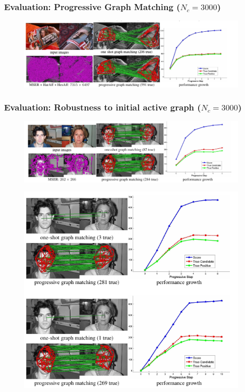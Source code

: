 \documentclass[hyperref={pdfpagelabels=false}]{beamer}
\begin{document}
\begin{frame}
\frametitle{Evaluation: Progressive Graph Matching ($N_c=3000$)}
\begin{figure}
  \includegraphics[scale=0.5]{fig6csub.png}
\end{figure}
\end{frame}


\begin{frame}[allowframebreaks]
\frametitle{Evaluation: Robustness to initial active graph ($N_c=3000$)}
\begin{figure}
  \includegraphics[scale=0.5]{fig7asub.png}
\end{figure}

\framebreak

\begin{figure}
  \includegraphics[scale=0.5]{fig7bcsub.png}
\end{figure}
\end{frame}
\end{document}
